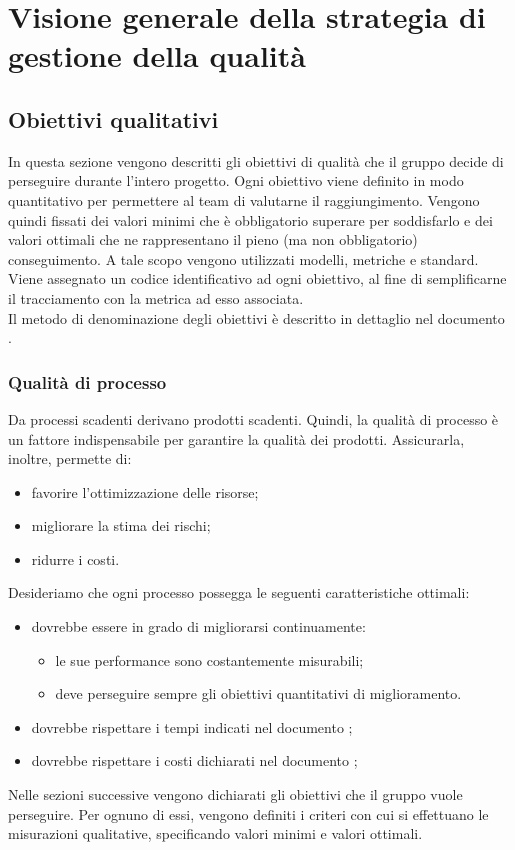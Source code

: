 \documentclass[PianoDiQualifica.tex]{subfiles}
\begin{document}
\section{Visione generale della strategia di gestione della qualità}
	\subsection{Obiettivi qualitativi}
		In questa sezione vengono descritti gli obiettivi di qualità che il gruppo \GRUPPO{} decide di perseguire durante l'intero progetto.
		Ogni obiettivo viene definito in modo quantitativo per permettere al team di valutarne il raggiungimento.
		Vengono quindi fissati dei valori minimi che è obbligatorio superare per soddisfarlo e dei valori ottimali che ne rappresentano il pieno (ma non obbligatorio) conseguimento.
		A tale scopo vengono utilizzati modelli, metriche e standard. \\
		Viene assegnato un codice identificativo ad ogni obiettivo, al fine di semplificarne il tracciamento con la metrica ad esso associata. \\
		Il metodo di denominazione degli obiettivi è descritto in dettaglio nel documento \NPdocRR{}.
		
		\subsubsection{Qualità di processo}
		Da processi scadenti derivano prodotti scadenti. Quindi, la qualità di processo è un fattore indispensabile per garantire la qualità dei prodotti. Assicurarla, inoltre, permette di:
		\begin{itemize}
			\item favorire l'ottimizzazione delle risorse; 
			\item migliorare la stima dei rischi;
			\item ridurre i costi.
		\end{itemize}
		Desideriamo che ogni processo possegga le seguenti caratteristiche ottimali:
		\begin{itemize}
			\item dovrebbe essere in grado di migliorarsi continuamente:
			\begin{itemize}
					\item le sue performance sono costantemente misurabili;
					\item deve perseguire sempre gli obiettivi quantitativi di miglioramento.
			\end{itemize}
			\item dovrebbe rispettare i tempi indicati nel documento \PPdocRR;
			\item dovrebbe rispettare i costi dichiarati nel documento \PPdocRR;
		\end{itemize}
		Nelle sezioni successive vengono dichiarati gli obiettivi che il gruppo vuole perseguire. Per ognuno di essi, vengono definiti i criteri con cui si effettuano le misurazioni qualitative,
		specificando valori minimi e valori ottimali.
\end{document}
